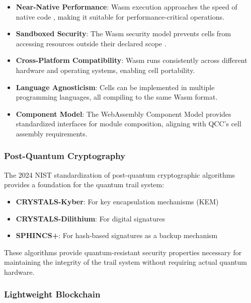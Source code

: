 \documentclass[11pt,a4paper]{article}
\begin{document}
\begin{itemize}
    \item \textbf{Near-Native Performance}: Wasm execution approaches the speed of native code \cite{wasmperf}, making it suitable for performance-critical operations.
    
    \item \textbf{Sandboxed Security}: The Wasm security model prevents cells from accessing resources outside their declared scope \cite{wasmsecurity}.
    
    \item \textbf{Cross-Platform Compatibility}: Wasm runs consistently across different hardware and operating systems, enabling cell portability.
    
    \item \textbf{Language Agnosticism}: Cells can be implemented in multiple programming languages, all compiling to the same Wasm format.
    
    \item \textbf{Component Model}: The WebAssembly Component Model \cite{wasmcomponent} provides standardized interfaces for module composition, aligning with QCC's cell assembly requirements.
\end{itemize}

\subsubsection{Post-Quantum Cryptography}

The 2024 NIST standardization of post-quantum cryptographic algorithms \cite{nist} provides a foundation for the quantum trail system:

\begin{itemize}
    \item \textbf{CRYSTALS-Kyber}: For key encapsulation mechanisms (KEM)
    \item \textbf{CRYSTALS-Dilithium}: For digital signatures
    \item \textbf{SPHINCS+}: For hash-based signatures as a backup mechanism
\end{itemize}

These algorithms provide quantum-resistant security properties necessary for maintaining the integrity of the trail system without requiring actual quantum hardware.

\subsubsection{Lightweight Blockchain}
\end{document}
